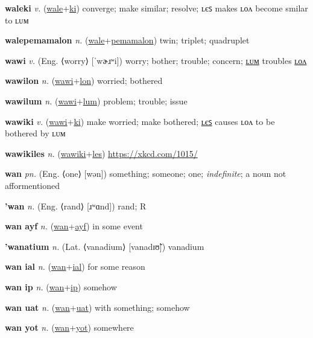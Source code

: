 \textbf{\hypertarget{waleki}{waleki}} \textit{v.} (\hyperlink{wale}{wale}+\allowbreak \hyperlink{ki}{ki})
converge; make similar; resolve; ʟєꜱ makes ʟᴏᴧ become smilar to ʟᴜᴍ

\textbf{\hypertarget{walepemamalon}{walepemamalon}} \textit{n.} (\hyperlink{wale}{wale}+\allowbreak \hyperlink{pemamalon}{pemamalon})
twin; triplet; quadruplet

\textbf{\hypertarget{wawi}{wawi}} \textit{v.} (Eng. ⟨worry⟩ [ˈwɚɹʷi])
worry; bother; trouble; concern; \hyperlink{wawilum}{ʟᴜᴍ} troubles \hyperlink{wawilon}{ʟᴏᴧ}

\textbf{\hypertarget{wawilon}{wawilon}} \textit{n.} (\hyperlink{wawi}{wawi}+\allowbreak \hyperlink{lon}{lon})
worried; bothered

\textbf{\hypertarget{wawilum}{wawilum}} \textit{n.} (\hyperlink{wawi}{wawi}+\allowbreak \hyperlink{lum}{lum})
problem; trouble; issue

\textbf{\hypertarget{wawiki}{wawiki}} \textit{v.} (\hyperlink{wawi}{wawi}+\allowbreak \hyperlink{ki}{ki})
make worried; make bothered; \hyperlink{wawikiles}{ʟєꜱ} causes ʟᴏᴧ to be bothered by ʟᴜᴍ

\textbf{\hypertarget{wawikiles}{wawikiles}} \textit{n.} (\hyperlink{wawiki}{wawiki}+\allowbreak \hyperlink{les}{les})
\url{https://xkcd.com/1015/}

\textbf{\hypertarget{wan}{wan}} \textit{pn.} (Eng. ⟨one⟩ [wən])
something; someone; one; \textit{indefinite}; a noun not afformentioned

\textbf{\hypertarget{'wan}{'wan}} \textit{n.} (Eng. ⟨rand⟩ [ɹʷɑnd])
rand; R

\textbf{\hypertarget{wan ayf}{wan ayf}} \textit{n.} (\hyperlink{wan}{wan}+\allowbreak \hyperlink{ayf}{ayf})
in some event

\textbf{\hypertarget{'wanatium}{'wanatium}} \textit{n.} (Lat. ⟨vanadium⟩ [vanadɪʊ̃])
vanadium

\textbf{\hypertarget{wan ial}{wan ial}} \textit{n.} (\hyperlink{wan}{wan}+\allowbreak \hyperlink{ial}{ial})
for some reason

\textbf{\hypertarget{wan ip}{wan ip}} \textit{n.} (\hyperlink{wan}{wan}+\allowbreak \hyperlink{ip}{ip})
somehow

\textbf{\hypertarget{wan uat}{wan uat}} \textit{n.} (\hyperlink{wan}{wan}+\allowbreak \hyperlink{uat}{uat})
with something; somehow

\textbf{\hypertarget{wan yot}{wan yot}} \textit{n.} (\hyperlink{wan}{wan}+\allowbreak \hyperlink{yot}{yot})
somewhere

